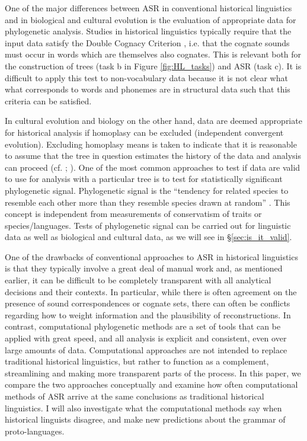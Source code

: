 \documentclass[12pt,letterpaper]{article}
\begin{document}
One of the major differences between ASR in conventional historical linguistics and in biological and cultural evolution is the evaluation of appropriate data for phylogenetic analysis. Studies in historical linguistics typically require that the input data satisfy the Double Cognacy Criterion \citep{walkden_2013}, i.e. that the cognate sounds must occur in words which are themselves also cognates. This is relevant both for the construction of trees (task b in Figure \ref{fig:HL_tasks}) and ASR (task c). It is difficult to apply this test to non-vocabulary data because it is not clear what what corresponds to words and phonemes are in structural data such that this criteria can be satisfied. 

In cultural evolution and biology on the other hand, data are deemed appropriate for historical analysis if homoplasy can be excluded (independent convergent evolution). Excluding homoplasy means is taken to indicate that it is reasonable to assume that the tree in question estimates the history of the data and analysis can proceed (cf. \citealt{holland2020accuracy}; \citealt{evans2021uses}). One of the most common approaches to test if data are valid to use for analysis with a particular tree is to test for statistically significant phylogenetic signal. Phylogenetic signal is the ``tendency for related species to resemble each other more than they resemble species drawn at random'' \citep[905]{blomberg2002tempo}. This concept is independent from measurements of conservatism of traits or species/languages. Tests of phylogenetic signal can be carried out for linguistic data as well as biological and cultural data, as we will see in §\ref{sec:is_it_valid}.

One of the drawbacks of conventional approaches to ASR in historical linguistics is that they typically involve a great deal of manual work and, as mentioned earlier, it can be difficult to be completely transparent with all analytical decisions and their contexts. In particular, while there is often agreement on the presence of sound correspondences or cognate sets, there can often be conflicts regarding how to weight information and the plausibility of reconstructions. In contrast, computational phylogenetic methods are a set of tools that can be applied with great speed, and all analysis is explicit and consistent, even over large amounts of data. Computational approaches are not intended to replace traditional historical linguistics, but rather to function as a complement, streamlining and making more transparent parts of the process. In this paper, we compare the two approaches conceptually and examine how often computational methods of ASR arrive at the same conclusions as traditional historical linguistics. I will also investigate what the computational methods say when historical linguists disagree, and make new predictions about the grammar of proto-languages.
\end{document}
